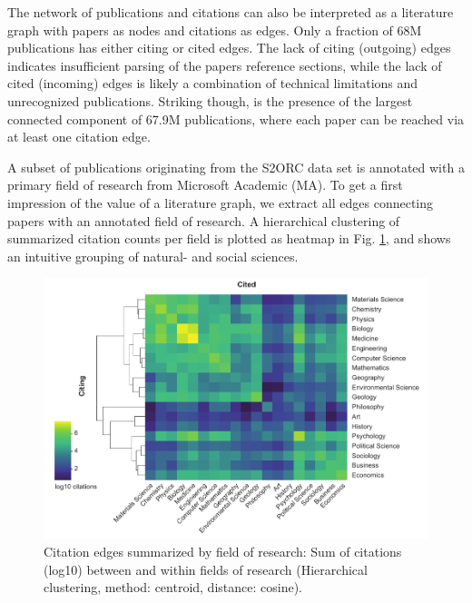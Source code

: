The network of publications and citations can also be interpreted as a literature graph with papers as nodes and citations as edges.
Only a fraction of 68M publications has either citing or cited edges.
The lack of citing (outgoing) edges indicates insufficient parsing of the papers reference sections, while the lack of cited (incoming) edges is likely a combination of technical limitations and unrecognized publications.
Striking though, is the presence of the largest connected component of 67.9M publications, where each paper can be reached via at least one citation edge.

A subset of publications originating from the S2ORC data set is annotated with a primary field of research from Microsoft Academic (MA). 
To get a first impression of the value of a literature graph, we extract all edges connecting papers with an annotated field of research.
A hierarchical clustering of summarized citation counts per field is plotted as heatmap in Fig. \ref{fig:state_of_art:field_interactions}, and shows an intuitive grouping of natural- and social sciences.

\begin{figure}[h]
	\centering
	\includegraphics[width=1.0\textwidth]{figures/state_of_art/field_interactions.pdf}
	\captionsetup{format=plain}
	\caption[Scientific field interactions]{Citation edges summarized by field of research: Sum of citations (log10) between and within fields of research (Hierarchical clustering, method: centroid, distance: cosine).}
	\label{fig:state_of_art:field_interactions}
\end{figure}


